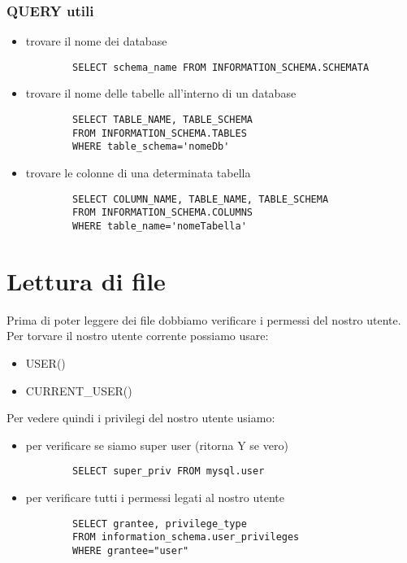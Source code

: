 \subsubsection{QUERY utili}
\begin{itemize}
    \item trovare il nome dei database
    \begin{verbatim}
        SELECT schema_name FROM INFORMATION_SCHEMA.SCHEMATA
    \end{verbatim}
    \item trovare il nome delle tabelle all'interno di un database
    \begin{verbatim}
        SELECT TABLE_NAME, TABLE_SCHEMA 
        FROM INFORMATION_SCHEMA.TABLES 
        WHERE table_schema='nomeDb'
    \end{verbatim}
    \item trovare le colonne di una determinata tabella
    \begin{verbatim}
        SELECT COLUMN_NAME, TABLE_NAME, TABLE_SCHEMA 
        FROM INFORMATION_SCHEMA.COLUMNS 
        WHERE table_name='nomeTabella'
    \end{verbatim}
\end{itemize}

\section{Lettura di file}
Prima di poter leggere dei file dobbiamo verificare i permessi del nostro utente. Per torvare il nostro utente corrente possiamo usare:
\begin{itemize}
    \item USER()
    \item CURRENT\_USER()
\end{itemize}
Per vedere quindi i privilegi del nostro utente usiamo:
\begin{itemize}
    \item per verificare se siamo super user (ritorna Y se vero)
    \begin{verbatim}
        SELECT super_priv FROM mysql.user
    \end{verbatim}
    \item per verificare tutti i permessi legati al nostro utente
    \begin{verbatim}
        SELECT grantee, privilege_type 
        FROM information_schema.user_privileges 
        WHERE grantee="user"
    \end{verbatim}
\end{itemize}

